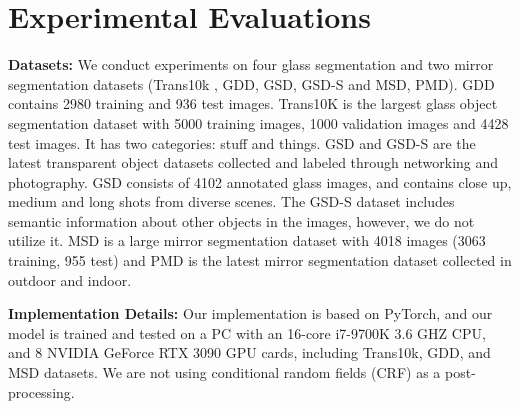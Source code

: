 \documentclass[10pt,twocolumn,letterpaper]{article}
\begin{document}
 
\section{Experimental Evaluations}
\textbf{Datasets:}
We conduct experiments on four glass segmentation and two mirror segmentation datasets (Trans10k \cite{xie2020segmenting}, GDD\cite{mei2020don}, GSD\cite{lin2021rich}, GSD-S\cite{linexploiting} and MSD\cite{yang2019my}, PMD\cite{lin2020progressive}). GDD contains 2980 training and 936 test images. Trans10K is the largest glass object segmentation dataset with 5000 training images, 1000 validation images and 4428 test images. It has two categories: stuff and things. GSD and GSD-S are the latest transparent object datasets collected and labeled through networking and photography. GSD consists of 4102 annotated glass images, and contains close up, medium and long shots from diverse scenes. The GSD-S dataset includes semantic information about other objects in the images, however, we do not utilize it. MSD is a large mirror segmentation dataset with 4018 images (3063 training, 955 test) and PMD is the latest mirror segmentation dataset collected in outdoor and indoor. %

\textbf{Implementation Details:}
Our implementation is based on PyTorch, and our model is trained and tested on a PC with an 16-core i7-9700K 3.6 GHZ CPU, and 8 NVIDIA GeForce RTX 3090 GPU cards, including Trans10k, GDD, and MSD datasets. We are not using conditional random fields (CRF) \cite{fields2001probabilistic} as a post-processing.
\end{document}
